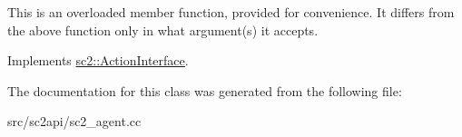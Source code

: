 This is an overloaded member function, provided for convenience. It differs from the above function only in what argument(s) it accepts. 

Implements \hyperlink{classsc2_1_1_action_interface_a061ab6708eef070a4db22a286372b3b0}{sc2\+::\+Action\+Interface}.



The documentation for this class was generated from the following file\+:\begin{DoxyCompactItemize}
\item 
src/sc2api/sc2\+\_\+agent.\+cc\end{DoxyCompactItemize}
